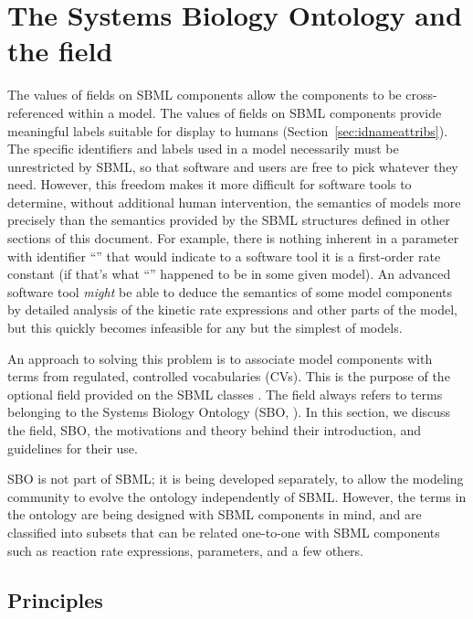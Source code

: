 
\section{The Systems Biology Ontology and the  field}
\label{sec:sboTerm}

The values of  fields on SBML components allow the
components to be cross-referenced within a model. The values of
 fields on SBML components provide meaningful labels
suitable for display to humans (Section~\ref{sec:idnameattribs}).
The specific identifiers and labels used in a model necessarily
must be unrestricted by SBML, so that software and users are free
to pick whatever they need.  However, this freedom makes it more
difficult for software tools to determine, without additional
human intervention, the semantics of models more precisely than
the semantics provided by the SBML structures defined in other
sections of this document. For example, there is nothing inherent
in a parameter with identifier ``'' that would indicate
to a software tool it is a first-order rate constant (if that's
what ``'' happened to be in some given model).  An
advanced software tool \emph{might} be able to deduce the
semantics of some model components by detailed analysis of the
kinetic rate expressions and other parts of the model, but this
quickly becomes infeasible for any but the simplest of models.

An approach to solving this problem is to associate model
components with terms from regulated, controlled vocabularies
(CVs).  This is the purpose of the optional  field
provided on the SBML classes \sboelements.  The 
field always refers to terms belonging to the Systems Biology Ontology
(SBO, \sboref). In this section, we discuss the  field, SBO,
the motivations and theory behind their introduction, and
guidelines for their use.

SBO is not part of SBML; it is being developed separately, to
allow the modeling community to evolve the ontology independently
of SBML.  However, the terms in the ontology are being designed
with SBML components in mind, and are classified into subsets that
can be related one-to-one with SBML components such as reaction
rate expressions, parameters, and a few others.


\subsection{Principles}
\label{sec:sbo-principles}

